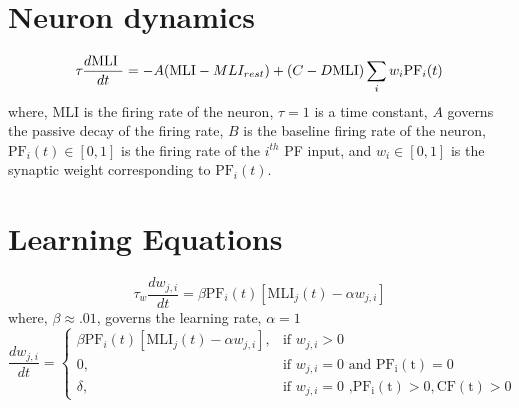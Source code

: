 \documentclass{article}
\begin{document}

\section{Neuron dynamics}
\begin{displaymath}
\tau_{}\frac{d\mathbf{\mathrm{M}\mathrm{L}\mathrm{I}}\mathcal{}\ }{dt}=-A(\mathbf{\mathrm{M}\mathrm{L}\mathrm{I}}-MLI_{rest})+(C-D\mathbf{\mathrm{M}\mathrm{L}\mathrm{I}})\sum_{i}w_{i}\mathrm{P}\mathrm{F}_{i}(t)_{\\ }
\end{displaymath}
where, \(\mathrm{M}\mathrm{L}\mathrm{I}\) is the firing rate of the neuron, \(\tau=1\) is a time constant, \(A\) governs the passive decay of the firing rate, \(B\) is the baseline firing rate of the neuron, \(\mathrm{P}\mathrm{F}_{i}(t)\in[0,1]\) is the firing rate of the \(i^{th}\) PF input, and \(w_{i}\in[0,1]\) is the synaptic weight corresponding to \(\mathrm{P}\mathrm{F}_{i}(t)\). 

\section{Learning Equations}
\begin{displaymath}
\tau_{w}\frac{dw_{j,i} }{dt}=\beta\mathrm{P}\mathrm{F}_{i}(t)[\mathbf{\mathrm{M}\mathrm{L}\mathrm{I}}_{j}(t)-\alpha w_{j,i}]
\end{displaymath}
where, \(\beta\approx.01\), governs the learning rate, \(\alpha=1\)
\begin{displaymath}
\frac{dw_{j,i} }{dt} = \begin{cases} \beta\mathrm{P}\mathrm{F}_{i}(t)[\mathbf{\mathrm{M}\mathrm{L}\mathrm{I}}_{j}(t)-\alpha w_{j,i}], & \mbox{if } w_{j,i}>0 \\ 0, & \mbox{if } w_{j,i}=0\mbox{ and } \mathrm{P}\mathrm{F_{i}(t)}=0 \\ \delta, & \mbox{if }w_{j,i}=0 \mbox{ ,} \mathrm{P}\mathrm{F_{i}(t)}>0,\mathrm{C}\mathrm{F(t)}>0 \end{cases}
\end{displaymath}
\end{document}
